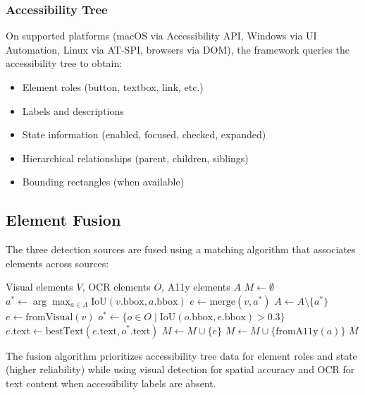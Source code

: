 \subsubsection{Accessibility Tree}

On supported platforms (macOS via Accessibility API, Windows via UI Automation, Linux via AT-SPI, browsers via DOM), the framework queries the accessibility tree to obtain:

\begin{itemize}[leftmargin=*]
    \item Element roles (button, textbox, link, etc.)
    \item Labels and descriptions
    \item State information (enabled, focused, checked, expanded)
    \item Hierarchical relationships (parent, children, siblings)
    \item Bounding rectangles (when available)
\end{itemize}

\subsection{Element Fusion}

The three detection sources are fused using a matching algorithm that associates elements across sources:

\begin{algorithm}[t]
\caption{Multi-Source Element Fusion}
\label{alg:fusion}
\begin{algorithmic}[1]
\REQUIRE Visual elements $V$, OCR elements $O$, A11y elements $A$
\STATE $M \gets \emptyset$ 
    \STATE $a^* \gets \arg\max_{a \in A} \text{IoU}(v.\text{bbox}, a.\text{bbox})$
        \STATE $e \gets \text{merge}(v, a^*)$
        \STATE $A \gets A \setminus \{a^*\}$
    \ELSE
        \STATE $e \gets \text{fromVisual}(v)$
    \ENDIF
    \STATE $o^* \gets \{o \in O \mid \text{IoU}(o.\text{bbox}, e.\text{bbox}) > 0.3\}$
    \STATE $e.\text{text} \gets \text{bestText}(e.\text{text}, o^*.\text{text})$
    \STATE $M \gets M \cup \{e\}$
\ENDFOR
{}
    \STATE $M \gets M \cup \{\text{fromA11y}(a)\}$ 
\ENDFOR
\RETURN $M$
\end{algorithmic}
\end{algorithm}

The fusion algorithm prioritizes accessibility tree data for element roles and state (higher reliability) while using visual detection for spatial accuracy and OCR for text content when accessibility labels are absent.

